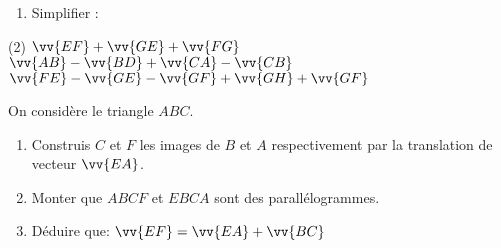 \documentclass[a4paper,12pt]{article}
\begin{document}
\begin{exo}
\begin{enumerate}
\item Simplifier :
\end{enumerate}
\begin{tasks}[style=itemize](2)
\task $\vv{EF}+\vv{GE}+\vv{FG} $
\task $\vv{AB}-\vv{BD}+\vv{CA}-\vv{CB}$
\task $\vv{FE}-\vv{GE}-\vv{GF}+\vv{GH}+\vv{GF}$
\end{tasks}
\end{exo}

\begin{exo}
On considère le triangle $ABC$.
\begin{enumerate}
\item Construis $C$ et $F$ les images de $B$ et $A$ respectivement par la translation de vecteur $\vv{EA}$.
\item Monter que $ABCF$ et $EBCA$ sont des parallélogrammes.
\item Déduire que: $\vv{EF}=\vv{EA}+\vv{BC}$
\end{enumerate}
\end{exo}
\end{document}
